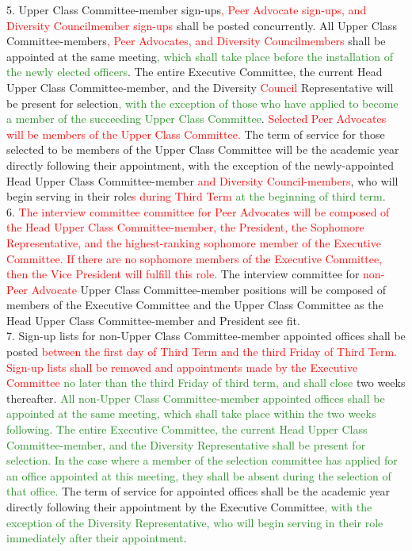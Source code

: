 \documentclass[10pt]{article} %
\newcommand{\add}[1]{\textcolor{ForestGreen}{#1}} %
\newcommand{\del}[1]{\textcolor{red}{#1}} %
\newcommand{\swap}[2]{\del{#1} \add{#2}} %
\begin{document}
\begin{itemize}
        5. Upper Class Committee-member sign-ups\del{, Peer Advocate sign-ups, and Diversity Councilmember sign-ups} shall be posted concurrently. All Upper Class Committee-members\del{, Peer Advocates, and Diversity Councilmembers} shall be appointed at the same meeting\add{, which shall take place before the installation of the newly elected officers}. The entire Executive Committee, the current Head Upper Class Committee-member, and the Diversity \del{Council} Representative will be present for selection\add{, with the exception of those who have applied to become a member of the succeeding Upper Class Committee}. \del{Selected Peer Advocates will be members of the Upper Class Committee.} The term of service for those selected to be members of the Upper Class Committee will be the academic year directly following their appointment, with the exception of the newly-appointed Head Upper Class Committee-member \del{and Diversity Council-members}, who will begin serving in their role\swap{s during Third Term}{at the beginning of third term}. \\
        6. \del{The interview committee committee for Peer Advocates will be composed of the Head Upper Class Committee-member, the President, the Sophomore Representative, and the highest-ranking sophomore member of the Executive Committee. If there are no sophomore members of the Executive Committee, then the Vice President will fulfill this role.} The interview committee for \del{non-Peer Advocate} Upper Class Committee-member positions will be composed of members of the Executive Committee and the Upper Class Committee as the Head Upper Class Committee-member and President see fit. \\
        7. Sign-up lists for non-Upper Class Committee-member appointed offices shall be posted \swap{between the first day of Third Term and the third Friday of Third Term. Sign-up lists shall be removed and appointments made by the Executive Committee}{no later than the third Friday of third term, and shall close} two weeks thereafter. \add{All non-Upper Class Committee-member appointed offices shall be appointed at the same meeting, which shall take place within the two weeks following. The entire Executive Committee, the current Head Upper Class Committee-member, and the Diversity Representative shall be present for selection. In the case where a member of the selection committee has applied for an office appointed at this meeting, they shall be absent during the selection of that office.} The term of service for appointed offices shall be the academic year directly following their appointment by the Executive Committee\add{, with the exception of the Diversity Representative, who will begin serving in their role immediately after their appointment}. \\ \\

\end{itemize}
\end{document}
